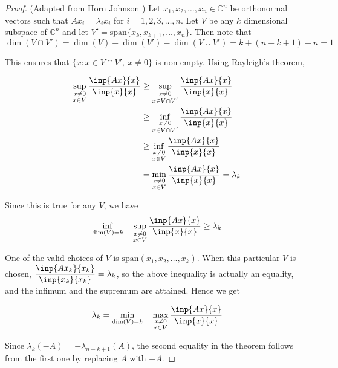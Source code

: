 \documentclass[twoside]{article}
\theoremstyle{plain}
\theoremstyle{definition}
\theoremstyle{remark}
\begin{document}
\begin{proof} (Adapted from Horn Johnson \cite{horn_johnson_2013})
Let \(x_1, x_2, \ldots , x_n \in \mathbb{C}^n\) be orthonormal vectors such that \(Ax_i = \lambda_i x_i\) for \(i = 1, 2, 3, \ldots , n\).  Let \(V\)  be any \(k\) dimensional subspace of \(\mathbb{C}^n\) and let \(V' = \mathrm{span}\{ x_k, x_{k + 1} , \ldots , x_n\}\). Then note that 
\[\dim(V \cap V') = \dim(V) + \dim(V') - \dim(V \cup V')  = k + (n - k + 1)  - n =  1\]

This ensures that \(\{x : x \in V \cap V', \ x \ne 0\}\) is non-empty. Using Rayleigh's theorem,

\begin{equation*} \begin{split}
\sup_{\substack{x \neq 0 \\ x \in V}} \frac{\inp{Ax}{x}}{\inp{x}{x}} & \ge \sup_{\substack{x \neq 0 \\ x \in V \cap V'}} \frac{\inp{A x}{x}}{\inp{x}{x}} \\
 & \ge \inf_{\substack{x \neq 0 \\ x \in V \cap V'}} \frac{\inp{A x}{x}}{\inp{x}{x}} \\
 & \ge \inf_{\substack{x \neq 0 \\ x \in V }} \frac{\inp{A x}{x}}{\inp{x}{x}} \\
 & = \min_{\substack{x \neq 0 \\ x \in V }} \frac{\inp{A x}{x}}{\inp{x}{x}}   = \lambda_k 
\end{split} \end{equation*}

Since this is true for any \(V\), we have 
\[ \inf_{\dim(V) =k} \quad \sup_{\substack{x \neq 0 \\ x \in V }} \frac{\inp{A x}{x}}{\inp{x}{x}}  \ge \lambda_k \]

One of the valid choices of \(V\) is \(\mathrm{span}(x_1, x_2, \ldots , x_k)\). When this particular \(V\) is chosen, \(\displaystyle \frac{\inp{Ax_k}{x_k}}{\inp{x_k}{x_k}} = \lambda_k\), so the above inequality is actually an equality, and the infimum and the supremum are attained. Hence we get 

\[ \lambda_k = \min_{\dim(V) = k}  \quad \max_{\substack{x \ne 0 \\ x \in V}} \frac{\inp{Ax}{x}}{\inp{x}{x}} \]

Since \(\lambda_k ( - A) = - \lambda_{n - k + 1} (A)\), the second equality in the theorem follows from the first one by replacing \(A\) with \(-A\).
\end{proof}
\end{document}
